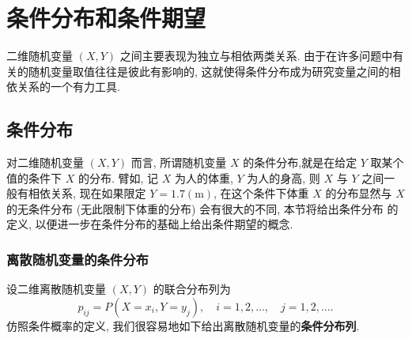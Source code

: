	\section{条件分布和条件期望}\label{sec:3.5}

	二维随机变量 $(X,Y)$ 之间主要表现为独立与相依两类关系. 
	由于在许多问题中有关的随机变量取值往往是彼此有影响的, 这就使得条件分布成为研究变量之间的相依关系的一个有力工具.

	\subsection{条件分布}\label{ssec:3.5.1}
 
	对二维随机变量 $(X,Y)$ 而言, 所谓随机变量 $X$ 的条件分布,就是在给定 $Y$ 取某个值的条件下 $X$ 的分布. 
	臂如, 记 $X$ 为人的体重, $Y$ 为人的身高, 则 $X$ 与 $Y$ 之间一般有相依关系, 现在如果限定 $Y=1.7(\mathrm{m})$, 
	在这个条件下体重 $X$ 的分布显然与 $X$ 的无条件分布 (无此限制下体重的分布) 会有很大的不同, 本节将给出条件分布
	的定义, 以便进一步在条件分布的基础上给出条件期望的概念.

	\subsubsection{离散随机变量的条件分布}

	设二维离散随机变量 $(X,Y)$ 的联合分布列为
	\[
		p_{ij} = P(X=x_i, Y= y_j),\quad i=1,2,\ldots,\quad j=1,2,\ldots.
	\]
	仿照条件概率的定义, 我们很容易地如下给出离散随机变量的\textbf{条件分布列}.

